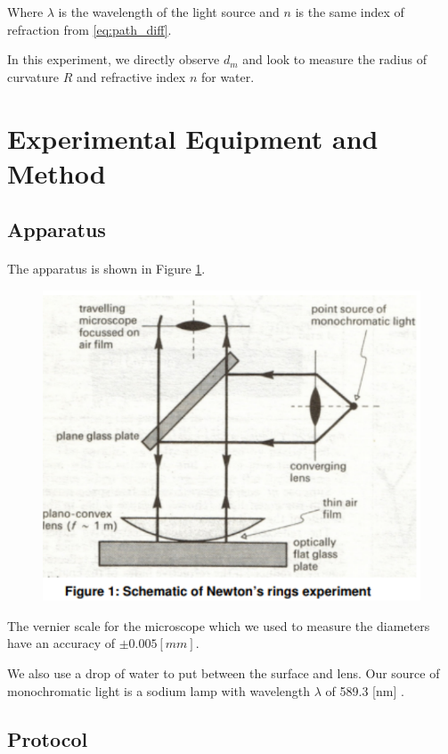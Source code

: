 \documentclass{article}
\begin{document}
Where $\lambda$ is the wavelength of the light source and $n$ is the same index of refraction from \eqref{eq:path_diff}.

In this experiment, we directly observe $d_m$ and look to measure the radius of curvature $R$ and refractive index $n$ for water.

\section{Experimental Equipment and Method}
\subsection{Apparatus}
\paragraph{}
The apparatus is shown in Figure \ref{fig:apparatus}.

\begin{figure}[h]
  \includegraphics{./img/apparatus.pdf}
  \label{fig:apparatus}
\end{figure}

The vernier scale for the microscope which we used to measure the diameters have an accuracy of $\pm 0.005 [mm]$.

We also use a drop of water to put between the surface and lens.
Our source of monochromatic light is a sodium lamp with wavelength $\lambda$ of 589.3 [nm] \autocite{UPCSE2018}.

\subsection{Protocol}
\end{document}
